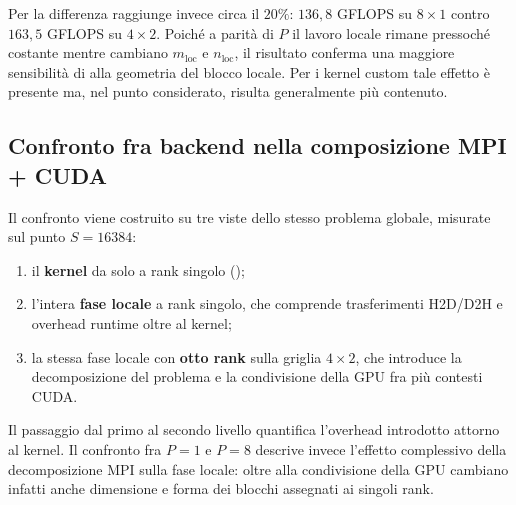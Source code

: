 Per  la differenza raggiunge invece circa il $20\%$:
$136{,}8$ GFLOPS su $8\times1$ contro $163{,}5$ GFLOPS su $4\times2$.
Poiché a parità di $P$ il lavoro locale rimane pressoché costante mentre
cambiano $m_{\mathrm{loc}}$ e $n_{\mathrm{loc}}$, il risultato conferma una
maggiore sensibilità di  alla geometria del blocco locale.
Per i kernel custom tale effetto è presente ma, nel punto considerato,
risulta generalmente più contenuto.

\subsection{Confronto fra backend nella composizione MPI + CUDA}
\label{sec:ris-fase4-backend}

Il confronto viene costruito su tre viste dello stesso problema globale,
misurate sul punto $S=16384$:

\begin{enumerate}
  \item il \textbf{kernel} da solo a rank singolo
  ();
  \item l'intera \textbf{fase locale} a rank singolo, che comprende
  trasferimenti H2D/D2H e overhead runtime oltre al kernel;
  \item la stessa fase locale con \textbf{otto rank} sulla griglia
  $4\times2$, che introduce la decomposizione del problema e la
  condivisione della GPU fra più contesti CUDA.
\end{enumerate}

Il passaggio dal primo al secondo livello quantifica l'overhead introdotto
attorno al kernel. Il confronto fra $P=1$ e $P=8$ descrive invece l'effetto
complessivo della decomposizione MPI sulla fase locale: oltre alla
condivisione della GPU cambiano infatti anche dimensione e forma dei blocchi
assegnati ai singoli rank.

